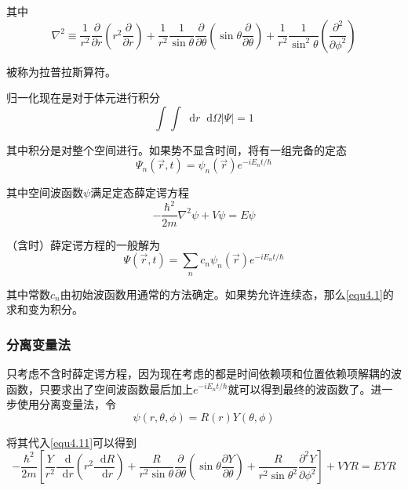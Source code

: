 \documentclass[UTF8]{ctexart}
\begin{document}
\noindent 其中
\begin{equation}
    \nabla^2 \equiv \frac{1}{r^2} \frac{\partial}{\partial r} \left(r^2 \frac{\partial}{\partial r}\right) + \frac{1}{r^2} \frac{1}{\sin \theta} \frac{\partial}{\partial \theta}\left(\sin \theta \frac{\partial}{\partial \theta}\right) + \frac{1}{r^2} \frac{1}{\sin^2 \theta}  \left(\frac{\partial^2}{\partial \phi^2}\right)
\end{equation}

\noindent 被称为拉普拉斯算符。

    归一化现在是对于体元进行积分
    \begin{equation}
        \int \int \mathop{}\!\mathrm{d} r \mathop{}\!\mathrm{d} \Omega |\Psi| =1
    \end{equation}

\noindent 其中积分是对整个空间进行。如果势不显含时间，将有一组完备的定态
\begin{equation}
    \Psi_n(\vec{r},t) = \psi_n(\vec{r}) e^{-iE_n t/\hbar}
\end{equation}

\noindent 其中空间波函数$\psi$满足定态薛定谔方程
\begin{equation}
    - \frac{\hbar^2}{2m} \nabla^2 \psi + V \psi = E \psi \label{equ4.11}
\end{equation}

    （含时）薛定谔方程的一般解为
    \begin{equation}
        \Psi(\vec{r},t) = \sum_n c_n \psi_n (\vec{r}) e^{-i E_n t/\hbar}\label{equ4.1}
    \end{equation}

\noindent 其中常数$c_n$由初始波函数用通常的方法确定。如果势允许连续态，那么\autoref{equ4.1}的求和变为积分。

    \subsubsection{分离变量法}
    只考虑不含时薛定谔方程，因为现在考虑的都是时间依赖项和位置依赖项解耦的波函数，只要求出了空间波函数最后加上$e^{- i  E_n t/\hbar}$就可以得到最终的波函数了。进一步使用分离变量法，令
    \begin{equation}
        \psi(r,\theta,\phi) = R(r) Y(\theta,\phi)
    \end{equation}

\noindent 将其代入\autoref{equ4.11}可以得到 
\begin{equation}
    -\frac{\hbar^{2}}{2 m}\left[\frac{Y}{r^{2}} \frac{\mathop{}\!\mathrm{d} }{\mathop{}\!\mathrm{d} r}\left(r^{2} \frac{\mathop{}\!\mathrm{d} R}{\mathop{}\!\mathrm{d} r}\right)+\frac{R}{r^{2} \sin \theta} \frac{\partial}{\partial \theta}\left(\sin \theta \frac{\partial Y}{\partial \theta}\right)+\frac{R}{r^{2} \sin \theta^{2}} \frac{\partial^{2} Y}{\partial \phi^{2}}\right] + V Y R = E Y R
    \end{equation}
\end{document}
